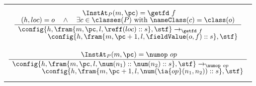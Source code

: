 \begin{figure}[htbp]
\begin{center}
\begin{tabular}[c]{cc}
\\

\multicolumn{2}{c}{
\begin{minipage}[c]{10cm}  \footnotesize
$$\frac{%
{\renewcommand{\arraystretch}{0.7} \begin{array}[c]{c}
\ \InstAt_P(m,\pc)=\getfd\ f\\
(h, loc)=o\quad \wedge\quad \exists c\in \classes(P)\text{ with } \nameClass(c)=\class(o)
\end{array}}}%
{\begin{array}[t]{l}
\config{h,\fram{m,\pc,l,\reff(loc)::s},\stf} \to_{\getfd\ f}\\ 
\spp \config{h,\fram{m,\pc+1,l,\fieldValue(o, f)::s},\stf}
\end{array}}
$$
\end{minipage}}
\vspace*{0.15cm}
\\

\multicolumn{2}{c}{
\begin{minipage}[c]{10cm}  \footnotesize
$$\frac{%
{\renewcommand{\arraystretch}{0.7} \begin{array}[c]{c}
\ \InstAt_P(m,\pc)=\numop\ op
\end{array}}}%
{\begin{array}[t]{l}
\config{h,\fram{m,\pc,l,\num(n_1)::\num(n_2)::s},\stf} \to_{\numop\ op}\\ 
\spp \config{h,\fram{m,\pc+1,l,\num(\ia{op}(n_1,n_2))::s},\stf}
\end{array}}
$$
\end{minipage}}

\\


\end{tabular}
\end{center}
\end{figure}
